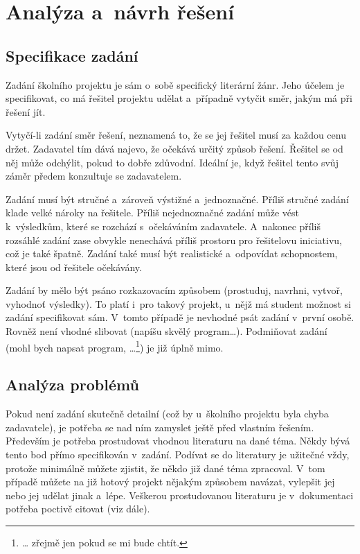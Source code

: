 \chapter{Analýza a~návrh řešení}


\section{Specifikace zadání}
Zadání školního projektu je sám o~sobě specifický literární žánr. Jeho účelem je specifikovat, co má řešitel projektu udělat a~případně vytyčit směr, jakým má při řešení jít.

Vytyčí-li zadání směr řešení, neznamená to, že se jej řešitel musí za každou cenu držet. Zadavatel tím dává najevo, že očekává určitý způsob řešení. Řešitel se od něj může odchýlit, pokud to dobře zdůvodní. Ideální je, když řešitel tento svůj záměr předem konzultuje se zadavatelem.

Zadání musí být stručné a~zároveň výstižné a~jednoznačné. Příliš stručné zadání klade velké nároky na řešitele. Příliš nejednoznačné zadání může vést k~výsledkům, které se rozchází s~očekáváním zadavatele. A~nakonec příliš rozsáhlé zadání zase obvykle nenechává příliš prostoru pro řešitelovu iniciativu, což je také špatně. Zadání také musí být realistické a~odpovídat schopnostem, které jsou od řešitele očekávány.

Zadání by mělo být psáno rozkazovacím způsobem (prostuduj, navrhni, vytvoř, vyhodnoť výsledky). To platí i~pro takový projekt, u~nějž má student možnost si zadání specifikovat sám. V~tomto případě je nevhodné psát zadání v~první osobě. Rovněž není vhodné slibovat (napíšu skvělý program\dots). Podmiňovat zadání (mohl bych napsat program, \dots\footnote{\dots{} zřejmě jen pokud se mi bude chtít.}) je již úplně mimo.

\section{Analýza problémů}
Pokud není zadání skutečně detailní (což by u~školního projektu byla chyba zadavatele), je potřeba se nad ním zamyslet ještě před vlastním řešením. Především je potřeba prostudovat vhodnou literaturu na dané téma. Někdy bývá tento bod přímo specifikován v~zadání. Podívat se do literatury je užitečné vždy, protože minimálně můžete zjistit, že někdo již dané téma zpracoval. V~tom případě můžete na již hotový projekt nějakým způsobem navázat, vylepšit jej nebo jej udělat jinak a~lépe. Veškerou prostudovanou literaturu je v~dokumentaci potřeba poctivě citovat (viz dále).


